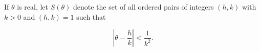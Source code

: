 If $\theta$ is real, let $S(\theta)$ denote the set of all ordered pairs of integers $(h, k)$ with $k > 0$ and $(h, k) = 1$ such that

$$\left| \theta - \frac{h}{k} \right| < \frac{1}{k^2}.$$
